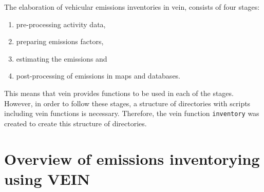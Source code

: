 \documentclass[12pt,graybox,envcountchap,sectrefs]{krantz}
\providecommand{\tightlist}{%
  \setlength{\itemsep}{0pt}\setlength{\parskip}{0pt}}
\theoremstyle{definition}
\theoremstyle{definition}
\theoremstyle{definition}
\theoremstyle{remark}
\begin{document}
The elaboration of vehicular emissions inventories in vein, consists of
four stages:

\begin{enumerate}
\def\labelenumi{\arabic{enumi}.}
\tightlist
\item
  pre-processing activity data,
\item
  preparing emissions factors,
\item
  estimating the emissions and
\item
  post-processing of emissions in maps and databases.
\end{enumerate}

This means that vein provides functions to be used in each of the
stages. However, in order to follow these stages, a structure of
directories with scripts including vein functions is necessary.
Therefore, the vein function \texttt{inventory} was created to create
this structure of directories.

\section{Overview of emissions inventorying using
VEIN}\label{veinstructure}
\end{document}

